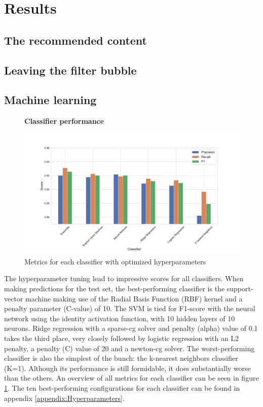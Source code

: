 \documentclass[../main.tex]{subfiles}
\begin{document}
\section{Results}

\subsection{The recommended content}

\subsection{Leaving the filter bubble}

\subsection{Machine learning}

\begin{figure}[t!]
  \textbf{Classifier performance}\par\medskip
  \centering
  \includegraphics[keepaspectratio, width=\textwidth]{images/classifier_results.pdf}
  \caption{Metrics for each classifier with optimized hyperparameters}
  \label{fig:ML_scores}
\end{figure}

The hyperparameter tuning lead to impressive scores for all classifiers. When making predictions for the
test set, the best-performing classifier is the support-vector machine making use of the Radial Basis
Function (RBF) kernel and a penalty parameter (C-value) of 10. The SVM is tied for F1-score with the neural 
network using the identity activation function, with 10 hidden layers of 10 neurons. Ridge regression with a 
sparse-cg solver and penalty (alpha) value of 0.1 takes the third place, very closely followed by logistic 
regression with an L2 penalty, a penalty (C) value of 20 and a newton-cg solver. The worst-performing 
classifier is also the simplest of the bunch: the k-nearest neighbors classifier (K=1). Although its 
performance is still formidable, it does substantially worse than the others. An overview of all metrics for 
each classifier can be seen in figure \ref{fig:ML_scores}. The ten best-performing configurations for each
classifier can be found in appendix \ref{appendix:Hyperparameters}.
\end{document}
